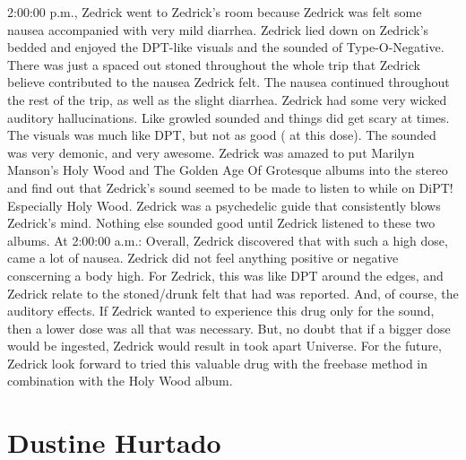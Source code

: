 \documentclass[12pt]{book}
\begin{document}
2:00:00 p.m., Zedrick went to Zedrick's room because Zedrick was felt some nausea accompanied with very mild diarrhea. Zedrick lied down on Zedrick's bedded and enjoyed the DPT-like visuals and the sounded of Type-O-Negative. There was just a spaced out stoned throughout the whole trip that Zedrick believe contributed to the nausea Zedrick felt. The nausea continued throughout the rest of the trip, as well as the slight diarrhea. Zedrick had some very wicked auditory hallucinations. Like growled sounded and things did get scary at times. The visuals was much like DPT, but not as good ( at this dose). The sounded was very demonic, and very awesome. Zedrick was amazed to put Marilyn Manson's Holy Wood and The Golden Age Of Grotesque albums into the stereo and find out that Zedrick's sound seemed to be made to listen to while on DiPT! Especially Holy Wood. Zedrick was a psychedelic guide that consistently blows Zedrick's mind. Nothing else sounded good until Zedrick listened to these two albums. At 2:00:00 a.m.: Overall, Zedrick discovered that with such a high dose, came a lot of nausea. Zedrick did not feel anything positive or negative conscerning a body high. For Zedrick, this was like DPT around the edges, and Zedrick relate to the stoned/drunk felt that had was reported. And, of course, the auditory effects. If Zedrick wanted to experience this drug only for the sound, then a lower dose was all that was necessary. But, no doubt that if a bigger dose would be ingested, Zedrick would result in took apart Universe. For the future, Zedrick look forward to tried this valuable drug with the freebase method in combination with the Holy Wood album.



\chapter{Dustine Hurtado}
\end{document}
